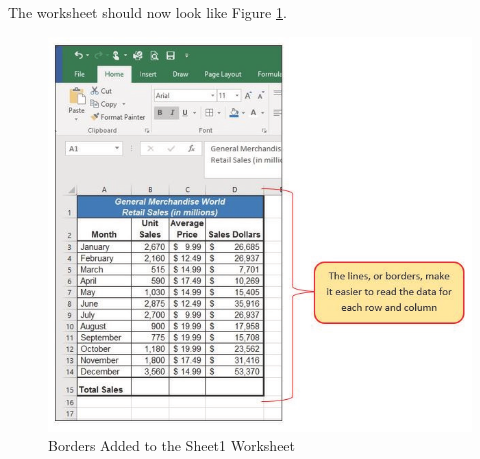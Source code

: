 The  worksheet should now look like Figure \ref{01:fig44}.

\begin{figure}[H]
	\centering
	\includegraphics[width=\maxwidth{.95\linewidth}]{gfx/ch01_fig44}
	\caption{Borders Added to the Sheet1 Worksheet}
	\label{01:fig44}
\end{figure}

